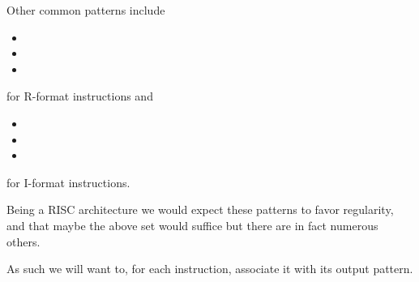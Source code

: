 Other common patterns include 

\begin{itemize}
\item {}
\item {}
\item {}
\end{itemize}

for R-format instructions and

\begin{itemize}
\item {}
\item {}
\item {}
\end{itemize}

for I-format instructions.

Being a RISC architecture we would expect these patterns to favor
regularity, and that maybe the above set would suffice but there
are in fact numerous others.

As such we will want to, for each instruction, associate it with its
output pattern.
